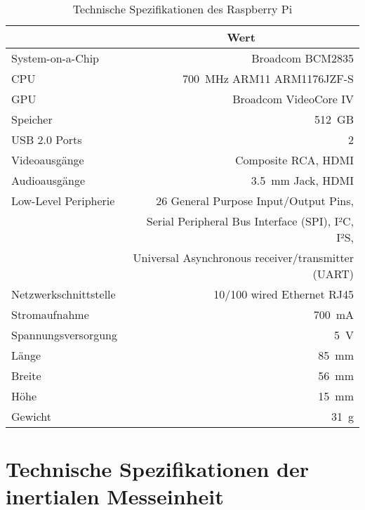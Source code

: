 \begin{table}[ht]
\begin{center}
\begin{tabular}{|l|r|}
\hline
\rowcolor{lightgray} \multicolumn{1}{|c|}{\textbf{Spezifikation}} & \multicolumn{1}{|c|}{\textbf{Wert}}\\
\hline
System-on-a-Chip & Broadcom BCM2835\\
\hline
CPU & \SI{700}{\mega\Hz} ARM11 ARM1176JZF-S\\
\hline
GPU & Broadcom VideoCore IV\\
\hline
Speicher & \SI{512}{GB}\\
\hline
USB 2.0 Ports & \SI{2}{}\\
\hline
Videoausgänge & Composite RCA, HDMI\\
\hline
Audioausgänge & \SI{3,5}{\milli\meter} Jack, HDMI\\
\hline
Low-Level Peripherie & \SI{26}{} General Purpose Input/Output Pins,\\
& Serial Peripheral Bus Interface (SPI), I²C, I²S,\\
& Universal Asynchronous receiver/transmitter (UART)\\
\hline
Netzwerkschnittstelle & \SI{10}{}/\SI{100}{} wired Ethernet RJ45\\
\hline
Stromaufnahme & \SI{700}{\milli\ampere}\\
\hline
Spannungsversorgung & \SI{5}{\volt}\\
\hline
Länge & \SI{85}{\milli\meter}\\
\hline
Breite & \SI{56}{\milli\meter}\\
\hline
Höhe & \SI{15}{\milli\meter}\\
\hline
Gewicht & \SI{31}{\gram}\\
\hline
\end{tabular}
\caption{Technische Spezifikationen des Raspberry Pi}
\end{center}
\label{tab:raspberry}
\end{table}

\clearpage{}

\section{Technische Spezifikationen der inertialen Messeinheit}
\label{app.imu}

